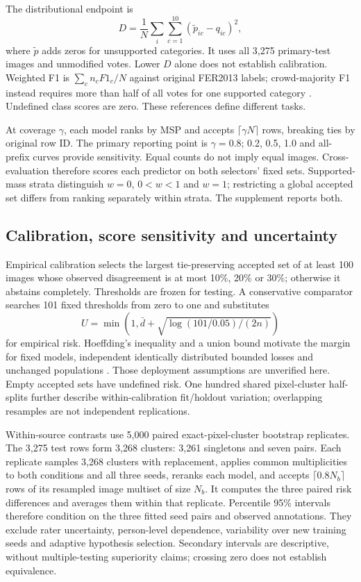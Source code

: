 The distributional endpoint is
\begin{equation}
D=\frac1N\sum_i\sum_{c=1}^{10}(\tilde p_{ic}-q_{ic})^2,
\end{equation}
where $\tilde p$ adds zeros for unsupported categories. It uses all 3,275 primary-test images and unmodified votes. Lower $D$ alone does not establish calibration. Weighted F1 is $\sum_c n_cF1_c/N$ against original FER2013 labels; crowd-majority F1 instead requires more than half of all votes for one supported category \cite{sokolova2009metrics}. Undefined class scores are zero. These references define different tasks.

At coverage $\gamma$, each model ranks by MSP and accepts $\lceil\gamma N\rceil$ rows, breaking ties by original row ID. The primary reporting point is $\gamma=0.8$; 0.2, 0.5, 1.0 and all-prefix curves provide sensitivity. Equal counts do not imply equal images. Cross-evaluation therefore scores each predictor on both selectors' fixed sets. Supported-mass strata distinguish $w=0$, $0<w<1$ and $w=1$; restricting a global accepted set differs from ranking separately within strata. The supplement reports both.

\subsection{Calibration, score sensitivity and uncertainty}
Empirical calibration selects the largest tie-preserving accepted set of at least 100 images whose observed disagreement is at most 10\%, 20\% or 30\%; otherwise it abstains completely. Thresholds are frozen for testing. A conservative comparator searches 101 fixed thresholds from zero to one and substitutes
\begin{equation}
U=\min\!\left(1,\bar d+\sqrt{\log(101/0.05)/(2n)}\right)
\end{equation}
for empirical risk. Hoeffding's inequality and a union bound motivate the margin for fixed models, independent identically distributed bounded losses and unchanged populations \cite{hoeffding1963}. Those deployment assumptions are unverified here. Empty accepted sets have undefined risk. One hundred shared pixel-cluster half-splits further describe within-calibration fit/holdout variation; overlapping resamples are not independent replications.

Within-source contrasts use 5,000 paired exact-pixel-cluster bootstrap replicates. The 3,275 test rows form 3,268 clusters: 3,261 singletons and seven pairs. Each replicate samples 3,268 clusters with replacement, applies common multiplicities to both conditions and all three seeds, reranks each model, and accepts $\lceil0.8N_b\rceil$ rows of its resampled image multiset of size $N_b$. It computes the three paired risk differences and averages them within that replicate. Percentile 95\% intervals therefore condition on the three fitted seed pairs and observed annotations. They exclude rater uncertainty, person-level dependence, variability over new training seeds and adaptive hypothesis selection. Secondary intervals are descriptive, without multiple-testing superiority claims; crossing zero does not establish equivalence.

